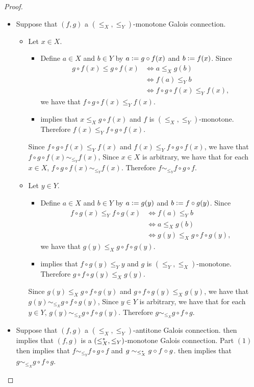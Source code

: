\documentclass{book}
\begin{document}
	\begin{proof}\
		\begin{itemize}
			\item Suppose that $(f,g)$ a $(\leq_X, \leq_Y)$-monotone Galois connection. 
			\begin{itemize}
				\item Let $x \in X$. 
				\begin{itemize}
					\item Define $a \in X$ and $b \in Y$ by $a \vcentcolon= g \circ f(x)$ and $b \vcentcolon= f(x)$. Since 
					\begin{align*}
						g \circ f(x) \leq g \circ f(x) 
						& \iff a \leq_X g(b) \\
						& \iff f(a) \leq_Y b \\
						& \iff f \circ g \circ f(x) \leq_Y f(x),  
					\end{align*}
					we have that $f \circ g \circ f(x) \leq_Y f(x)$.
					\item {} implies that $x \leq_X g \circ f(x)$ and $f$ is $(\leq_X, \leq_Y)$-monotone. Therefore $f(x) \leq_Y f \circ g \circ f(x)$. 
				\end{itemize}
				Since $f \circ g \circ f(x) \leq_Y f(x)$ and $f(x) \leq_Y f \circ g \circ f(x)$, we have that $f \circ g \circ f(x) \sim_{\leq_Y} f(x)$, Since $x \in X$ is arbitrary, we have that for each $x \in X$, $f \circ g \circ f(x) \sim_{\leq_Y} f(x)$. Therefore $f \sim_{\leq_Y} f \circ g \circ f$.
				\item Let $y \in Y$. 
				\begin{itemize}
					\item Define $a \in X$ and $b \in Y$ by $a \vcentcolon= g (y)$ and $b \vcentcolon= f \circ g(y)$. Since 
					\begin{align*}
						f \circ g(x) \leq_Y f \circ g(x) 
						& \iff f(a) \leq_Y b \\
						& \iff a \leq_X g(b) \\
						& \iff g(y) \leq_X g \circ f \circ g(y),  
					\end{align*}
					we have that $g(y) \leq_X g \circ f \circ g(y)$.
					\item {} implies that $f \circ g(y) \leq_Y y$ and $g$ is $(\leq_Y, \leq_X)$-monotone. Therefore $g \circ f \circ g(y) \leq_X g(y)$. 
				\end{itemize}
				Since $g(y) \leq_X g \circ f \circ g(y)$ and $g \circ f \circ g(y) \leq_X g(y)$, we have that $g(y) \sim_{\leq_X} g \circ f \circ g(y)$, Since $y \in Y$ is arbitrary, we have that for each $y \in Y$, $g(y) \sim_{\leq_X} g \circ f \circ g(y)$. Therefore $g \sim_{\leq_X} g \circ f \circ g$.
			\end{itemize}
			\item Suppose that $(f,g)$ a $(\leq_X, \leq_Y)$-antitone Galois connection.  then implies that $(f,g)$ is a $(\leq^*_X, \leq_Y)$-monotone Galois connection. Part $(1)$ then implies that $f \sim_{\leq_Y} f \circ g \circ f$ and $g \sim_{\leq^*_X} g \circ f \circ g $.  then implies that $g \sim_{\leq_X} g \circ f \circ g$.
		\end{itemize}
	\end{proof}
	
\end{document}
